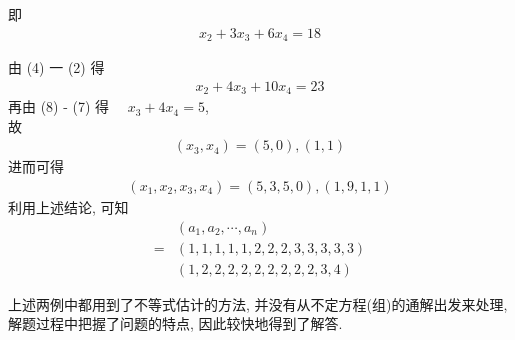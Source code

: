 \begin{solution}
	即
	\begin{align*}
		x_{2}+3 x_{3}+6 x_{4}=18
	\end{align*}

	由 (4) 一 (2) 得
	\begin{align*}
		x_{2}+4 x_{3}+10 x_{4}=23
	\end{align*}
	再由 (8) - (7) 得 $\quad x_{3}+4 x_{4}=5$,\\
	故
	\begin{align*}
		\left(x_{3}, x_{4}\right)=(5,0),(1,1)
	\end{align*}
	进而可得
	\begin{align*}
		\left(x_{1}, x_{2}, x_{3}, x_{4}\right)=(5,3,5,0),(1,9,1,1)
	\end{align*}
	利用上述结论, 可知\begin{align}
		  & \left(a_{1}, a_{2}, \cdots, a_{n}\right) \\
		= & (1,1,1,1,1,2,2,2,3,3,3,3,3)              \\
		  & (1,2,2,2,2,2,2,2,2,2,3,4)
	\end{align}
\end{solution}
\begin{note}
	上述两例中都用到了不等式估计的方法, 并没有从不定方程(组)的通解出发来处理, 解题过程中把握了问题的特点, 因此较快地得到了解答.
\end{note}

